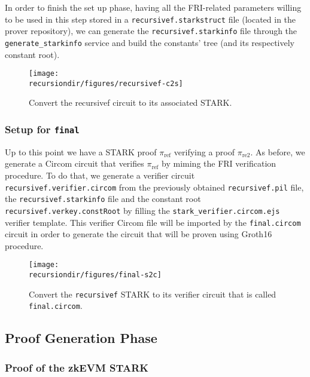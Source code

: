 In order to finish the set up phase, having all the FRI-related parameters willing to be used in this step stored in a \texttt{recursivef.starkstruct} file (located in the prover repository), we can generate the \texttt{recursivef.starkinfo} file through the \texttt{generate\_starkinfo} service and build the constants' tree (and its respectively constant root). 

\begin{figure}[H]
\centering
\texttt{[image: \\recursiondir/figures/recursivef-c2s]}
\caption{Convert the recursivef circuit to its associated STARK.}
\label{fig:recursivef-c2s}
\end{figure}




\subsubsection{Setup \stoc for \texttt{final}}

Up to this point we have a STARK proof $\pi_{\text{ref}}$ verifying a proof $\pi_{\text{re2}}$. As before, we generate a Circom circuit that verifies $\pi_{\text{ref}}$ by miming the FRI verification procedure. To do that, we generate a verifier circuit \texttt{recursivef.verifier.circom} from the previously obtained \texttt{recursivef.pil} file, the \texttt{recursivef.starkinfo} file and the constant root \texttt{recursivef.verkey.constRoot} by filling the \texttt{stark\_verifier.circom.ejs} verifier template. This verifier Circom file will be imported by the \texttt{final.circom} circuit in order to generate the circuit that will be proven using Groth16 procedure. 



\begin{figure}[H]
	\centering
	\texttt{[image: \\recursiondir/figures/final-s2c]}
	\caption{Convert the \texttt{recursivef} STARK to its verifier circuit that is called \texttt{final.circom}.}
	\label{fig:final-s2c}
\end{figure}



\subsection{Proof Generation Phase \label{subsec:proof:gen:phase}}

\subsubsection{Proof of the zkEVM STARK}

